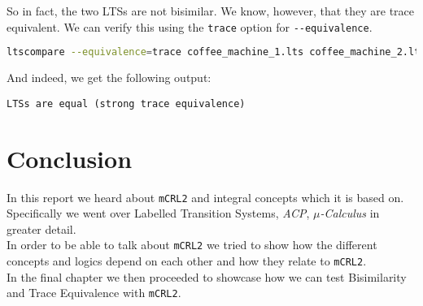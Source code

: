 \documentclass{clseminar}
\begin{document}
  So in fact, the two LTSs are not bisimilar. We know, however, that they are trace equivalent. We can verify this using the \texttt{trace} option for \texttt{-{}-equivalence}.

  \begin{lstlisting}[language=Bash]
ltscompare --equivalence=trace coffee_machine_1.lts coffee_machine_2.lts
  \end{lstlisting}

  And indeed, we get the following output:

  \begin{lstlisting}
LTSs are equal (strong trace equivalence)
  \end{lstlisting}

  \section{Conclusion}

  In this report we heard about \texttt{mCRL2} and integral concepts which it is based on. Specifically we went over Labelled Transition Systems, \textit{ACP}, \textit{$\mu$-Calculus} in greater detail. \\
  In order to be able to talk about \texttt{mCRL2} we tried to show how the different concepts and logics depend on each other and how they relate to \texttt{mCRL2}. \\
  In the final chapter we then proceeded to showcase how we can test Bisimilarity and Trace Equivalence with \texttt{mCRL2}.

  \backmatter

  \printbibliography
\end{document}
